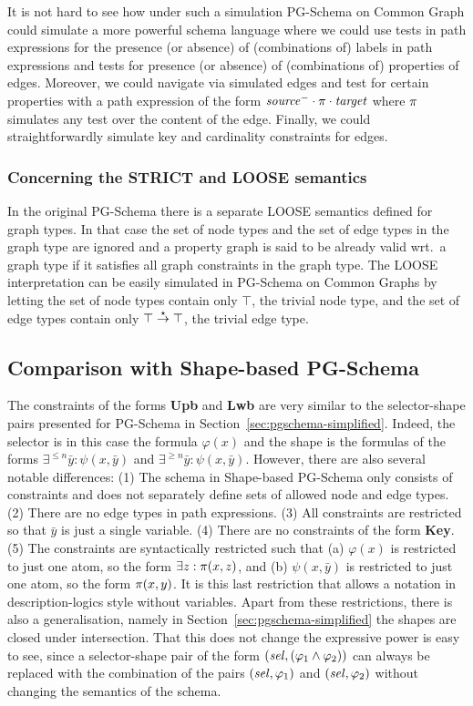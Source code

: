 It is not hard to see how under such a simulation PG-Schema on Common Graph could simulate a more powerful schema language where we could use tests in path expressions for the presence (or absence) of (combinations of) labels in path expressions and
tests for presence (or absence) of (combinations of) properties of edges.
Moreover, we could navigate via simulated edges and test for certain properties with a path expression of the form $\mathit{source}^{-} \cdot \pi \cdot \mathit{target}$ where $\pi$ simulates any test over the content of the edge.
Finally, we could straightforwardly simulate key and cardinality constraints for edges.

\subsubsection{Concerning the STRICT and LOOSE semantics} 

In the original PG-Schema there is a separate LOOSE semantics defined for graph types. 
In that case the set of node types and the set of edge types in the graph type are ignored and 
a property graph is said to be already valid wrt.\ a graph type if it satisfies all graph constraints in the graph type.
The LOOSE interpretation can be easily simulated in PG-Schema on Common Graphs
by letting the set of node types contain only $\top$, the trivial node type, 
and the set of edge types contain only ${\top}\stackrel{\star}{\rightarrow}{\top}$, the trivial edge type.

\subsection{Comparison with Shape-based PG-Schema}

The constraints of the forms \textbf{Upb} and \textbf{Lwb} are very similar to the selector-shape pairs presented for 
PG-Schema in Section~\ref{sec:pgschema-simplified}. 
Indeed, the selector is in this case the formula $\varphi(x)$ and the shape is 
the formulas of the forms $\exists^{\leq n} \bar{y} : \psi(x, \bar{y})$ and $\exists^{\geq n} \bar{y} : \psi(x, \bar{y})$.
However, there are also several notable differences:
(1) The schema in Shape-based PG-Schema only consists of constraints and does not separately define sets of allowed node and edge types.
(2) There are no edge types in path expressions. 
(3) All constraints are restricted so that $\bar{y}$ is just a single variable.
(4) There are no constraints of the form \textbf{Key}.
(5) The constraints are syntactically restricted such that (a)
$\varphi(x)$ is restricted to just one atom, so the form $\exists z : \pi(x, z)$, and (b)
$\psi(x, \bar{y})$ is restricted to just one atom, so the form $\pi(x, y)$. It is this last restriction that allows a notation in description-logics style without variables.
Apart from these restrictions, there is also a generalisation, namely in Section~\ref{sec:pgschema-simplified} the shapes are closed under intersection.
That this does not change the expressive power is easy to see, since a selector-shape pair of the form $(\mathit{sel}, (\varphi_1 \land \varphi_2))$ 
can always be replaced with the combination of the pairs  $(\mathit{sel}, \varphi_1)$ and $(\mathit{sel}, \varphi_2)$ without changing the semantics of the schema.

